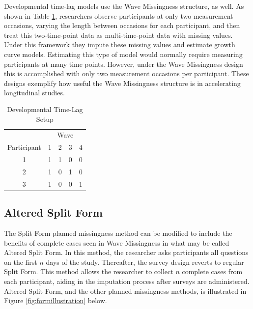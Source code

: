 \documentclass{svjour3}\usepackage[]{graphicx}\usepackage[]{color}
\begin{document}
Developmental time-lag models \citep{mcardle1997expanding} use the Wave Missingness structure, as well. As shown in Table \ref{tab:devtimelag}, researchers observe participants at only two measurement occasions, varying the length between occasions for each participant, and then treat this two-time-point data as multi-time-point data with missing values. Under this framework they impute these missing values and estimate growth curve models. Estimating this type of model would normally require measuring participants at many time points. However, under the Wave Missingness design this is accomplished with only two measurement occasions per participant. These designs exemplify how useful the Wave Missingness structure is in accelerating longitudinal studies. \par

\begin{table}[H]
	\centering
	\caption{Developmental Time-Lag Setup}
	\label{tab:devtimelag}
	\setlength{\tabcolsep}{0.75cm}
	\begin{tabular}{c|cccc}
		\toprule
		& \multicolumn{4}{c}{Wave} \\
		Participant & 1 & 2 & 3 & 4 \\
		\midrule
		1 & 1 & 1 & 0 & 0 \\
		2 & 1 & 0 & 1 & 0 \\
		3 & 1 & 0 & 0 & 1 \\
		\bottomrule
	\end{tabular}
\end{table}

\subsection{Altered Split Form}

The Split Form planned missingness method can be modified to include the benefits of complete cases seen in Wave Missingness in what may be called Altered Split Form. In this method, the researcher asks participants all questions on the first $n$ days of the study. Thereafter, the survey design reverts to regular Split Form. This method allows the researcher to collect $n$ complete cases from each participant, aiding in the imputation process after surveys are administered. Altered Split Form, and the other planned missingness methods, is illustrated in Figure \ref{fig:formillustration} below.
\end{document}
